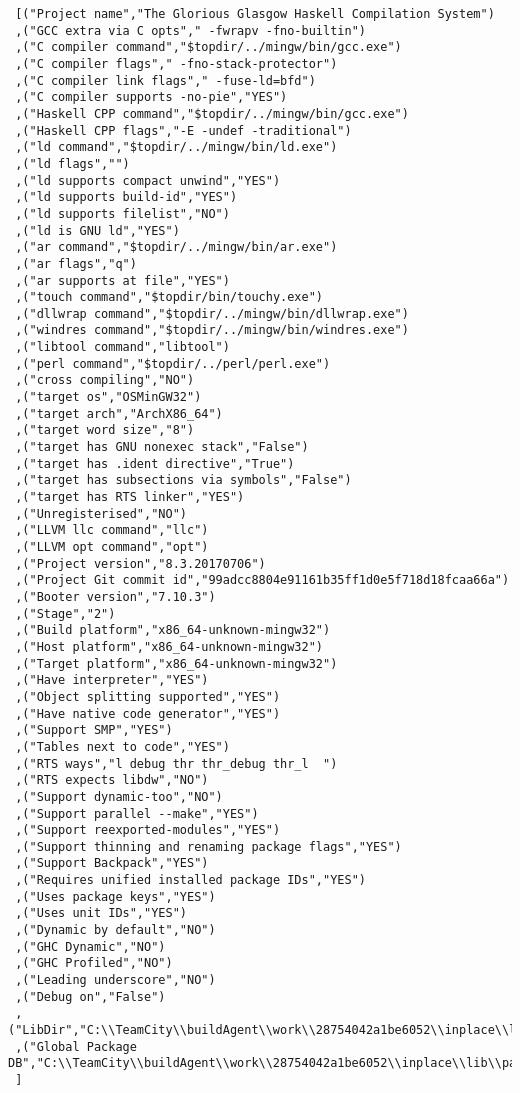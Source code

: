 \begin{verbatim}
 [("Project name","The Glorious Glasgow Haskell Compilation System")
 ,("GCC extra via C opts"," -fwrapv -fno-builtin")
 ,("C compiler command","$topdir/../mingw/bin/gcc.exe")
 ,("C compiler flags"," -fno-stack-protector")
 ,("C compiler link flags"," -fuse-ld=bfd")
 ,("C compiler supports -no-pie","YES")
 ,("Haskell CPP command","$topdir/../mingw/bin/gcc.exe")
 ,("Haskell CPP flags","-E -undef -traditional")
 ,("ld command","$topdir/../mingw/bin/ld.exe")
 ,("ld flags","")
 ,("ld supports compact unwind","YES")
 ,("ld supports build-id","YES")
 ,("ld supports filelist","NO")
 ,("ld is GNU ld","YES")
 ,("ar command","$topdir/../mingw/bin/ar.exe")
 ,("ar flags","q")
 ,("ar supports at file","YES")
 ,("touch command","$topdir/bin/touchy.exe")
 ,("dllwrap command","$topdir/../mingw/bin/dllwrap.exe")
 ,("windres command","$topdir/../mingw/bin/windres.exe")
 ,("libtool command","libtool")
 ,("perl command","$topdir/../perl/perl.exe")
 ,("cross compiling","NO")
 ,("target os","OSMinGW32")
 ,("target arch","ArchX86_64")
 ,("target word size","8")
 ,("target has GNU nonexec stack","False")
 ,("target has .ident directive","True")
 ,("target has subsections via symbols","False")
 ,("target has RTS linker","YES")
 ,("Unregisterised","NO")
 ,("LLVM llc command","llc")
 ,("LLVM opt command","opt")
 ,("Project version","8.3.20170706")
 ,("Project Git commit id","99adcc8804e91161b35ff1d0e5f718d18fcaa66a")
 ,("Booter version","7.10.3")
 ,("Stage","2")
 ,("Build platform","x86_64-unknown-mingw32")
 ,("Host platform","x86_64-unknown-mingw32")
 ,("Target platform","x86_64-unknown-mingw32")
 ,("Have interpreter","YES")
 ,("Object splitting supported","YES")
 ,("Have native code generator","YES")
 ,("Support SMP","YES")
 ,("Tables next to code","YES")
 ,("RTS ways","l debug thr thr_debug thr_l  ")
 ,("RTS expects libdw","NO")
 ,("Support dynamic-too","NO")
 ,("Support parallel --make","YES")
 ,("Support reexported-modules","YES")
 ,("Support thinning and renaming package flags","YES")
 ,("Support Backpack","YES")
 ,("Requires unified installed package IDs","YES")
 ,("Uses package keys","YES")
 ,("Uses unit IDs","YES")
 ,("Dynamic by default","NO")
 ,("GHC Dynamic","NO")
 ,("GHC Profiled","NO")
 ,("Leading underscore","NO")
 ,("Debug on","False")
 ,("LibDir","C:\\TeamCity\\buildAgent\\work\\28754042a1be6052\\inplace\\lib")
 ,("Global Package DB","C:\\TeamCity\\buildAgent\\work\\28754042a1be6052\\inplace\\lib\\package.conf.d")
 ]
\end{verbatim}
